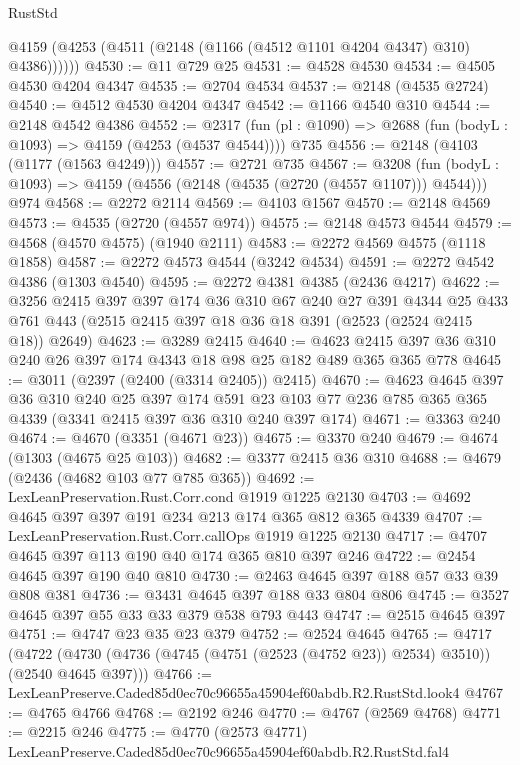 \begin{lexlean}{RustStd}
\begin{coremodule}
        @4159 (@4253 (@4511 (@2148 (@1166 (@4512 @1101 @4204 @4347) @310) @4386))))))
@4530 := @11 @729 @25
@4531 := @4528 @4530
@4534 := @4505 @4530 @4204 @4347
@4535 := @2704 @4534
@4537 := @2148 (@4535 @2724)
@4540 := @4512 @4530 @4204 @4347
@4542 := @1166 @4540 @310
@4544 := @2148 @4542 @4386
@4552 := @2317 (fun (pl : @1090) => @2688 (fun (bodyL : @1093) => @4159 (@4253 (@4537 @4544)))) @735
@4556 := @2148 (@4103 (@1177 (@1563 @4249)))
@4557 := @2721 @735
@4567 := @3208
    (fun (bodyL : @1093) => @4159 (@4556 (@2148 (@4535 (@2720 (@4557 @1107))) @4544)))
    @974
@4568 := @2272 @2114
@4569 := @4103 @1567
@4570 := @2148 @4569
@4573 := @4535 (@2720 (@4557 @974))
@4575 := @2148 @4573 @4544
@4579 := @4568 (@4570 @4575) (@1940 @2111)
@4583 := @2272 @4569 @4575 (@1118 @1858)
@4587 := @2272 @4573 @4544 (@3242 @4534)
@4591 := @2272 @4542 @4386 (@1303 @4540)
@4595 := @2272 @4381 @4385 (@2436 @4217)
@4622 := @3256
    @2415
    @397
    @397
    @174
    @36
    @310
    @67
    @240
    @27
    @391
    @4344
    @25
    @433
    @761
    @443
    (@2515 @2415 @397 @18 @36 @18 @391 (@2523 (@2524 @2415 @18)) @2649)
@4623 := @3289 @2415
@4640 := @4623 @2415 @397 @36 @310 @240 @26 @397 @174 @4343 @18 @98 @25 @182 @489 @365 @365 @778
@4645 := @3011 (@2397 (@2400 (@3314 @2405)) @2415)
@4670 := @4623
    @4645
    @397
    @36
    @310
    @240
    @25
    @397
    @174
    @591
    @23
    @103
    @77
    @236
    @785
    @365
    @365
    @4339
    (@3341 @2415 @397 @36 @310 @240 @397 @174)
@4671 := @3363 @240
@4674 := @4670 (@3351 (@4671 @23))
@4675 := @3370 @240
@4679 := @4674 (@1303 (@4675 @25 @103))
@4682 := @3377 @2415 @36 @310
@4688 := @4679 (@2436 (@4682 @103 @77 @785 @365))
@4692 := LexLeanPreservation.Rust.Corr.cond @1919 @1225 @2130
@4703 := @4692 @4645 @397 @397 @191 @234 @213 @174 @365 @812 @365 @4339
@4707 := LexLeanPreservation.Rust.Corr.callOps @1919 @1225 @2130
@4717 := @4707 @4645 @397 @113 @190 @40 @174 @365 @810 @397 @246
@4722 := @2454 @4645 @397 @190 @40 @810
@4730 := @2463 @4645 @397 @188 @57 @33 @39 @808 @381
@4736 := @3431 @4645 @397 @188 @33 @804 @806
@4745 := @3527 @4645 @397 @55 @33 @33 @379 @538 @793 @443
@4747 := @2515 @4645 @397
@4751 := @4747 @23 @35 @23 @379
@4752 := @2524 @4645
@4765 := @4717
    (@4722 (@4730 (@4736 (@4745 (@4751 (@2523 (@4752 @23)) @2534) @3510)) (@2540 @4645 @397)))
@4766 := LexLeanPreserve.Caded85d0ec70c96655a45904ef60abdb.R2.RustStd.look4
@4767 := @4765 @4766
@4768 := @2192 @246
@4770 := @4767 (@2569 @4768)
@4771 := @2215 @246
@4775 := @4770 (@2573 @4771) LexLeanPreserve.Caded85d0ec70c96655a45904ef60abdb.R2.RustStd.fal4

\end{coremodule}
\end{lexlean}

